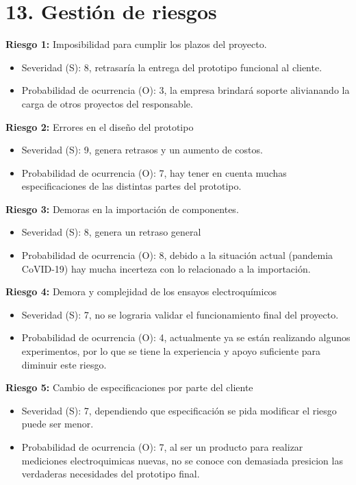 \documentclass[11pt]{charter}
\begin{document}
\section{13. Gestión de riesgos}
\label{sec:riesgos}

\textbf{Riesgo 1:} Imposibilidad para cumplir los plazos del proyecto.
\begin{itemize}
\item Severidad (S): 8, retrasaría la entrega del prototipo funcional al cliente.
\item Probabilidad de ocurrencia (O): 3, la empresa brindará soporte alivianando la carga de otros proyectos del responsable.
\end{itemize}

\textbf{Riesgo 2:} Errores en el diseño del prototipo
\begin{itemize}
\item Severidad (S): 9, genera retrasos y un aumento de costos.
\item Probabilidad de ocurrencia (O): 7, hay tener en cuenta muchas especificaciones de las distintas partes del prototipo.
\end{itemize}

\textbf{Riesgo 3:} Demoras en la importación de componentes.
\begin{itemize}
\item Severidad (S): 8, genera un retraso general 
\item Probabilidad de ocurrencia (O): 8, debido a la situación actual (pandemia CoVID-19) hay mucha incerteza con lo relacionado a la importación.
\end{itemize}

\textbf{Riesgo 4:} Demora y complejidad de los ensayos electroquímicos
\begin{itemize}
\item Severidad (S): 7, no se lograria validar el funcionamiento final del proyecto.
\item Probabilidad de ocurrencia (O): 4, actualmente ya se están realizando algunos experimentos, por lo que se tiene la experiencia y apoyo suficiente para diminuir este riesgo.
\end{itemize}

\textbf{Riesgo 5:} Cambio de especificaciones por parte del cliente
\begin{itemize}
\item Severidad (S): 7, dependiendo que especificación se pida modificar el riesgo puede ser menor.
\item Probabilidad de ocurrencia (O): 7, al ser un producto para realizar mediciones electroquimicas nuevas, no se conoce con demasiada presicion las verdaderas necesidades del prototipo final.
\end{itemize}
\end{document}

